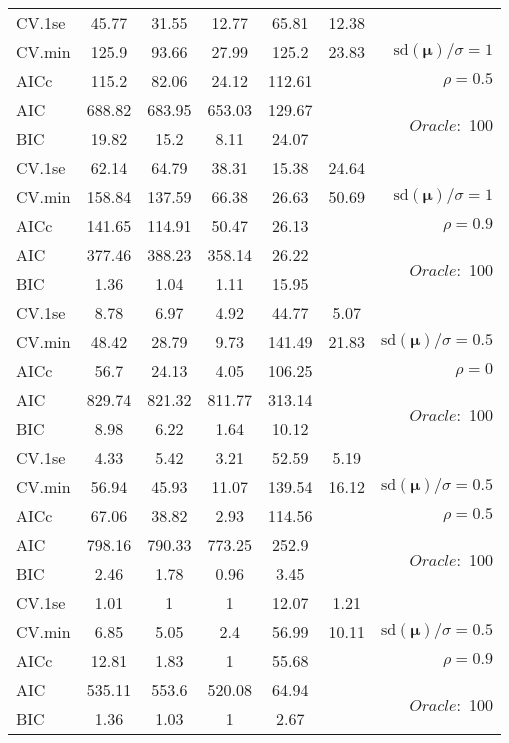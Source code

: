 \begin{table}
\begin{center}
\begin{tabular}{l*{5}{c}|r}
 \hline 
CV.1se & 45.77 & 31.55 & 12.77 & 65.81 & 12.38 & \\
CV.min & 125.9 & 93.66 & 27.99 & 125.2 & 23.83 &  $\mathrm{sd}(\mathbf{\mu})/\sigma=1$ \\
AICc & 115.2 & 82.06 & 24.12 & 112.61 & & $\rho=0.5$ \\
AIC & 688.82 & 683.95 & 653.03 & 129.67 & &  \multirow{2}{*}{$Oracle: $ 100} \\
BIC & 19.82 & 15.2 & 8.11 & 24.07 & &  \\
 \hline 
CV.1se & 62.14 & 64.79 & 38.31 & 15.38 & 24.64 & \\
CV.min & 158.84 & 137.59 & 66.38 & 26.63 & 50.69 &  $\mathrm{sd}(\mathbf{\mu})/\sigma=1$ \\
AICc & 141.65 & 114.91 & 50.47 & 26.13 & & $\rho=0.9$ \\
AIC & 377.46 & 388.23 & 358.14 & 26.22 & &  \multirow{2}{*}{$Oracle: $ 100} \\
BIC & 1.36 & 1.04 & 1.11 & 15.95 & &  \\
 \hline 
CV.1se & 8.78 & 6.97 & 4.92 & 44.77 & 5.07 & \\
CV.min & 48.42 & 28.79 & 9.73 & 141.49 & 21.83 &  $\mathrm{sd}(\mathbf{\mu})/\sigma=0.5$ \\
AICc & 56.7 & 24.13 & 4.05 & 106.25 & & $\rho=0$ \\
AIC & 829.74 & 821.32 & 811.77 & 313.14 & &  \multirow{2}{*}{$Oracle: $ 100} \\
BIC & 8.98 & 6.22 & 1.64 & 10.12 & &  \\
 \hline 
CV.1se & 4.33 & 5.42 & 3.21 & 52.59 & 5.19 & \\
CV.min & 56.94 & 45.93 & 11.07 & 139.54 & 16.12 &  $\mathrm{sd}(\mathbf{\mu})/\sigma=0.5$ \\
AICc & 67.06 & 38.82 & 2.93 & 114.56 & & $\rho=0.5$ \\
AIC & 798.16 & 790.33 & 773.25 & 252.9 & &  \multirow{2}{*}{$Oracle: $ 100} \\
BIC & 2.46 & 1.78 & 0.96 & 3.45 & &  \\
 \hline 
CV.1se & 1.01 & 1 & 1 & 12.07 & 1.21 & \\
CV.min & 6.85 & 5.05 & 2.4 & 56.99 & 10.11 &  $\mathrm{sd}(\mathbf{\mu})/\sigma=0.5$ \\
AICc & 12.81 & 1.83 & 1 & 55.68 & & $\rho=0.9$ \\
AIC & 535.11 & 553.6 & 520.08 & 64.94 & &  \multirow{2}{*}{$Oracle: $ 100} \\
BIC & 1.36 & 1.03 & 1 & 2.67 & &  \\
 \hline 
\end{tabular}
\end{center}
\vspace{-1cm}
\end{table}




